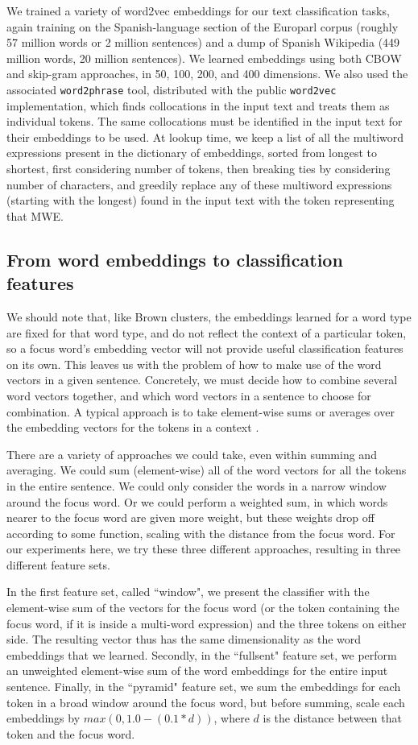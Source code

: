 We trained a variety of word2vec embeddings for our text classification tasks,
again training on the Spanish-language section of the Europarl corpus (roughly
57 million words or 2 million sentences) and a dump of Spanish Wikipedia (449
million words, 20 million sentences). We learned embeddings using both CBOW and
skip-gram approaches, in 50, 100, 200, and 400 dimensions. We also
used the associated \texttt{word2phrase} tool, distributed with the public
\texttt{word2vec} implementation, which finds collocations in the input text
and treats them as individual tokens. The same collocations must be identified
in the input text for their embeddings to be used. At lookup time, we keep a
list of all the multiword expressions present in the dictionary of embeddings,
sorted from longest to shortest, first considering number of tokens, then
breaking ties by considering number of characters, and greedily replace any of
these multiword expressions (starting with the longest) found in the input text
with the token representing that MWE.

\subsection{From word embeddings to classification features}
We should note that, like Brown clusters, the embeddings learned for a word
type are fixed for that word type, and do not reflect the context of a
particular token, so a focus word's embedding vector will not provide useful
classification features on its own. This leaves us with the problem of how to
make use of the word vectors in a given sentence. Concretely, we must decide
how to combine several word vectors together, and which word vectors in a
sentence to choose for combination. A typical approach is to take element-wise
sums or averages over the embedding vectors for the tokens in a context
\cite[Chapter 8]{Goldberg17}.

There are a variety of approaches we could take, even within summing and
averaging. We could sum (element-wise) all of the word vectors for all the
tokens in the entire sentence. We could only consider the words in a narrow
window around the focus word. Or we could perform a weighted sum, in which
words nearer to the focus word are given more weight, but these weights drop
off according to some function, scaling with the distance from the focus word.
For our experiments here, we try these three different approaches, resulting in
three different feature sets.

In the first feature set, called ``window", we present the classifier with the
element-wise sum of the vectors for the focus word (or the token containing the
focus word, if it is inside a multi-word expression) and the three tokens on
either side. The resulting vector thus has the same dimensionality as the word
embeddings that we learned. Secondly, in the ``fullsent" feature set, we
perform an unweighted element-wise sum of the word embeddings for the entire
input sentence. Finally, in the ``pyramid" feature set, we sum the embeddings
for each token in a broad window around the focus word, but before summing,
scale each embeddings by $max(0, 1.0 - (0.1 * d))$, where $d$ is the distance
between that token and the focus word.

